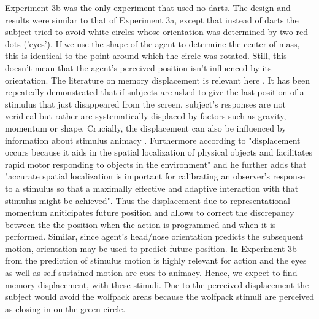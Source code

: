 \documentclass{article}
\begin{document}
Experiment 3b was the only experiment that used no darts. The design and results were similar to that of Experiment 3a, except that instead of darts the subject tried to avoid white circles whose orientation was determined by two red dots ('eyes'). If we use the shape of the agent to determine the center of mass, this is identical to the point around which the circle was rotated. Still, this doesn't mean that the agent's perceived position isn't influenced by its orientation. The literature on memory displacement is relevant here \citep{hubbard05}. It has been repeatedly demonstrated that if subjects are asked to give the last position of a stimulus that just disappeared from the screen, subject's responses are not veridical but rather are systematically displaced by factors such as gravity, momentum or shape. Crucially, the displacement can also be influenced by information about stimulus animacy \citep{freyd92}. Furthermore according to \citet{hubbard05} "displacement occurs because it aids in the spatial localization of physical objects and facilitates rapid motor responding to objects in the environment" and he further adds that "accurate spatial localization is important for calibrating an observer's response to a stimulus so that a maximally effective and adaptive interaction with that stimulus might be achieved". Thus the displacement due to representational momentum aniticipates future position and allows to correct the discrepancy between the the position when the action is programmed and when it is performed. Similar, since agent's head/nose orientation predicts the subsequent motion, orientation may be used to predict future position. In Experiment 3b from the prediction of stimulus motion is highly relevant for action and the eyes as well as self-sustained motion are cues to animacy. Hence, we expect to find memory displacement, with these stimuli. Due to the perceived displacement the subject would avoid the wolfpack areas because the wolfpack stimuli are perceived as closing in on the green circle.\\
\end{document}
